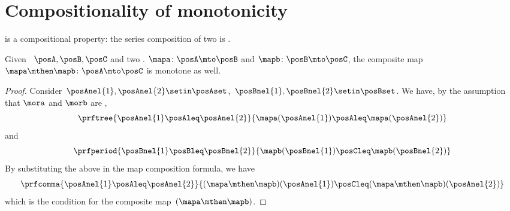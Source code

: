 
\section{Compositionality of monotonicity}
 is a compositional property: the series composition of two  is .
\begin{lemma}\label{lem:monotonicity-compositional}
    Given ~$\posA,\posB,\posC$ and two .
    $\mapa\colon \posA \mto \posB$ and $\mapb\colon \posB \mto \posC$, the composite map~$\mapa\mthen \mapb\colon \posA \mto \posC$ is monotone as well.
\end{lemma}
\begin{proof}
    Consider~$\posAnel{1},\posAnel{2} \setin \posAset$,~$\posBnel{1},\posBnel{2}\setin \posBset$.
    We have, by the assumption that $\mora$ and $\morb$ are ,
    \begin{equation}\label{eq:monotonicity-compositional-1}
        \prftree{\posAnel{1}\posAleq \posAnel{2}}{\mapa(\posAnel{1})\posAleq \mapa(\posAnel{2})}
    \end{equation}
    and
    \begin{equation}\label{eq:monotonicity-compositional-2}
        \prfperiod{\posBnel{1}\posBleq \posBnel{2}}{\mapb(\posBnel{1})\posCleq \mapb(\posBnel{2})}
    \end{equation}
    By substituting the above in the map composition formula, we have
    \begin{equation}\label{eq:monotonicity-compositional-3}
        \prfcomma{\posAnel{1}\posAleq \posAnel{2} }{ (\mapa\mthen \mapb)(\posAnel{1}) \posCleq (\mapa\mthen \mapb)(\posAnel{2})}
    \end{equation}
    which is the  condition for the composite map~$(\mapa\mthen\mapb)$.
\end{proof}

